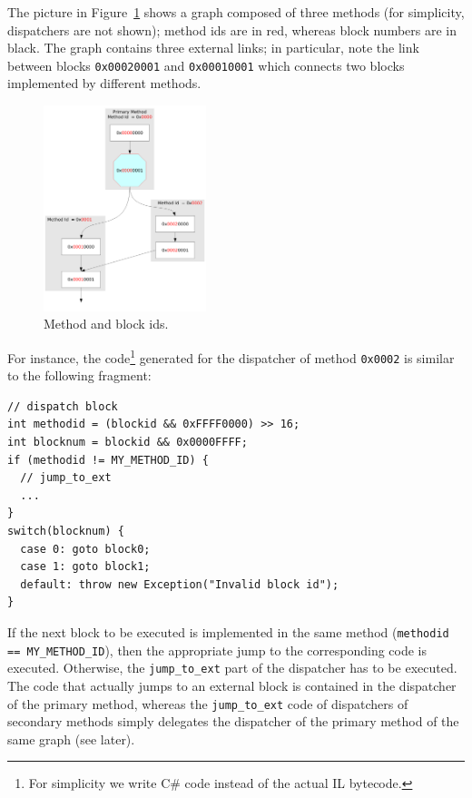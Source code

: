 The picture in Figure~\ref{block-id-fig} shows a graph composed of three methods (for
simplicity, dispatchers are not shown); method ids are in red, whereas
block numbers are in black. 
The graph contains three external links; in particular, note the link
between blocks \texttt{0x00020001} and \texttt{0x00010001} which
connects two blocks implemented by different methods.
\begin{figure}[h]
\begin{center}
\includegraphics[height=6cm]{blockid}
\caption{Method and block ids.}\label{block-id-fig}
\end{center}
\end{figure}

For instance, the code\footnote{For simplicity we write C\# code instead of
the actual IL bytecode.} generated for the dispatcher of method \texttt{0x0002}
is similar to the following fragment: 
\begin{small}
\begin{lstlisting}[language={[Sharp]C}]
// dispatch block
int methodid = (blockid && 0xFFFF0000) >> 16; 
int blocknum = blockid && 0x0000FFFF;         
if (methodid != MY_METHOD_ID) {
  // jump_to_ext 
  ...
}
switch(blocknum) {
  case 0: goto block0;
  case 1: goto block1;
  default: throw new Exception("Invalid block id");
}
\end{lstlisting}
\end{small}
If the next block to be executed is implemented in the same method
({\small\lstinline{methodid == MY_METHOD_ID}}), then the appropriate
jump to the corresponding code is executed. Otherwise, the \lstinline{jump_to_ext}
part of the dispatcher has to be executed.
The code that actually jumps to an external block is contained in
the dispatcher of the primary method, whereas the
\lstinline{jump_to_ext} code of dispatchers of secondary methods
simply delegates the dispatcher of the primary method of the same
graph (see later).

